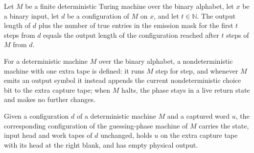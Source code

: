 \begin{lemma}
\label{Complexity.cont_mask_count}
\leanok
{}
Let $M$ be a finite deterministic Turing machine over the binary alphabet, let $x$ be a
binary input, let $d$ be a configuration of $M$ on $x$, and let $t\in\mathbb{N}$. The
output length of $d$ plus the number of true entries in the emission mask for the first
$t$ steps from $d$ equals the output length of the configuration reached after $t$ steps
of $M$ from $d$.
\end{lemma}

\begin{definition}
\label{Complexity.contGuessTM}
\leanok
{}
For a deterministic machine $M$ over the binary alphabet, a nondeterministic machine with one extra tape is defined: it runs $M$ step for step, and whenever $M$ emits an output symbol it instead appends the current nondeterministic choice bit to the extra capture tape; when $M$ halts, the phase stays in a live return state and makes no further changes.
\end{definition}

\begin{definition}
\label{Complexity.contGuessCfg}
\leanok
{}
Given a configuration $d$ of a deterministic machine $M$ and a captured word $u$, the corresponding configuration of the guessing-phase machine of $M$ carries the state, input head and work tapes of $d$ unchanged, holds $u$ on the extra capture tape with its head at the right blank, and has empty physical output.
\end{definition}

